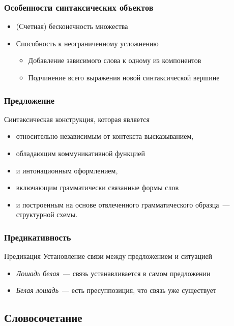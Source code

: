 \begin{frame}
  \frametitle{Особенности синтаксических объектов}

  \begin{itemize}
    \item (Счетная) бесконечность множества
    \item Способность к неограниченному усложнению \begin{itemize}
      \item Добавление зависимого слова к одному из компонентов
      \item Подчинение всего выражения новой синтаксической вершине
    \end{itemize}
  \end{itemize}
\end{frame}

\begin{frame}
  \frametitle{Предложение}

  Синтаксическая конструкция, которая является \begin{itemize}
    \item относительно независимым от контекста высказыванием,
    \item обладающим коммуникативной функцией
    \item и интонационным оформлением,
    \item включающим грамматически связанные формы слов
    \item и построенным на основе отвлеченного грамматического образца~--- структурной схемы.
  \end{itemize}
\end{frame}

\begin{frame}
  \frametitle{Предикативность}

  \begin{block}{Предикация}
    Установление связи между предложением и ситуацией
  \end{block}

  \vfill

  \begin{itemize}
    \item \textit{Лошадь белая}~--- связь устанавливается в самом предложении
    \item \textit{Белая лошадь}~--- есть пресуппозиция, что связь уже существует
  \end{itemize}
\end{frame}

\subsection{Словосочетание}

